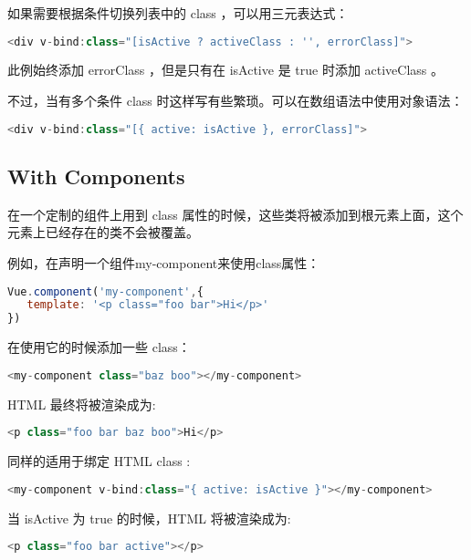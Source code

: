 如果需要根据条件切换列表中的 class ，可以用三元表达式：


\begin{lstlisting}[language=JavaScript]
<div v-bind:class="[isActive ? activeClass : '', errorClass]">
\end{lstlisting}

此例始终添加 errorClass ，但是只有在 isActive 是 true 时添加 activeClass 。

不过，当有多个条件 class 时这样写有些繁琐。可以在数组语法中使用对象语法：

\begin{lstlisting}[language=JavaScript]
<div v-bind:class="[{ active: isActive }, errorClass]">
\end{lstlisting}




\subsection{With Components}

在一个定制的组件上用到 class 属性的时候，这些类将被添加到根元素上面，这个元素上已经存在的类不会被覆盖。

例如，在声明一个组件my-component来使用class属性：

\begin{lstlisting}[language=JavaScript]
Vue.component('my-component',{
   template: '<p class="foo bar">Hi</p>'
})
\end{lstlisting}

在使用它的时候添加一些 class：

\begin{lstlisting}[language=JavaScript]
<my-component class="baz boo"></my-component>
\end{lstlisting}

HTML 最终将被渲染成为:


\begin{lstlisting}[language=JavaScript]
<p class="foo bar baz boo">Hi</p>
\end{lstlisting}

同样的适用于绑定 HTML class :

\begin{lstlisting}[language=JavaScript]
<my-component v-bind:class="{ active: isActive }"></my-component>
\end{lstlisting}

当 isActive 为 true 的时候，HTML 将被渲染成为:


\begin{lstlisting}[language=JavaScript]
<p class="foo bar active"></p>
\end{lstlisting}








